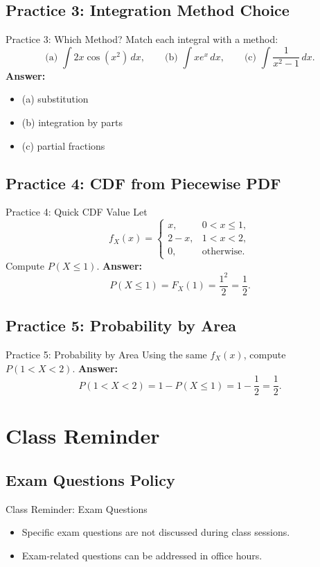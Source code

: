 \documentclass[aspectratio=169]{beamer}
\begin{document}
\subsection{Practice 3: Integration Method Choice}
\begin{frame}{Practice 3: Which Method?}
  Match each integral with a method:
  \[
    \text{(a) } \int 2x\cos(x^2)\,dx,\qquad
    \text{(b) } \int x e^x\,dx,\qquad
    \text{(c) } \int \frac{1}{x^2-1}\,dx.
  \]
  \pause
  \textbf{Answer:}
  \begin{itemize}
    \item (a) substitution
    \item (b) integration by parts
    \item (c) partial fractions
  \end{itemize}
\end{frame}

\subsection{Practice 4: CDF from Piecewise PDF}
\begin{frame}{Practice 4: Quick CDF Value}
  Let
  \[
    f_X(x)=
    \begin{cases}
      x, & 0<x\le 1,\\
      2-x, & 1<x<2,\\
      0, & \text{otherwise}.
    \end{cases}
  \]
  Compute \(P(X\le 1)\).
  \pause
  \textbf{Answer:}
  \[
    P(X\le 1)=F_X(1)=\frac{1^2}{2}=\frac{1}{2}.
  \]
\end{frame}

\subsection{Practice 5: Probability by Area}
\begin{frame}{Practice 5: Probability by Area}
  Using the same \(f_X(x)\), compute \(P(1<X<2)\).
  \pause
  \textbf{Answer:}
  \[
    P(1<X<2)=1-P(X\le 1)=1-\frac{1}{2}=\frac{1}{2}.
  \]
\end{frame}

\section{Class Reminder}

\subsection{Exam Questions Policy}
\begin{frame}{Class Reminder: Exam Questions}
  \begin{itemize}
    \item Specific exam questions are not discussed during class sessions.
    \item Exam-related questions can be addressed in office hours.
  \end{itemize}
\end{frame}
\end{document}
